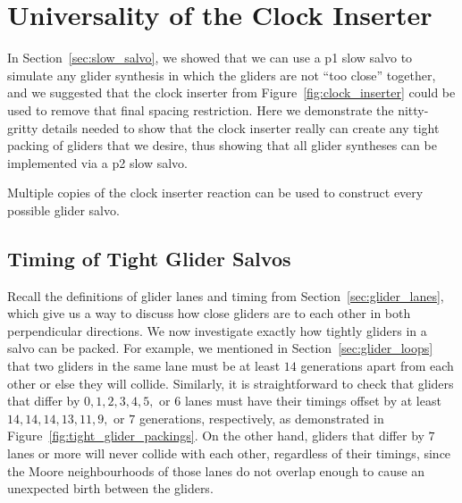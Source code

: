 
\renewcommand{\chapterfolder}{glider_synthesis/}
\chapter{Universality of the Clock Inserter}\label{chp:appendix_salvo}

In Section~\ref{sec:slow_salvo}, we showed that we can use a p1 slow salvo to simulate any glider synthesis in which the gliders are not ``too close'' together, and we suggested that the clock inserter from Figure~\ref{fig:clock_inserter} could be used to remove that final spacing restriction. Here we demonstrate the nitty-gritty details needed to show that the clock inserter really can create any tight packing of gliders that we desire, thus showing that all glider syntheses can be implemented via a p2 slow salvo.
\begin{proposition}\label{prop:clock_inserter}
	Multiple copies of the clock inserter reaction can be used to construct every possible glider salvo.
\end{proposition}


\section{Timing of Tight Glider Salvos}\label{sec:salvo_timing}

Recall the definitions of glider lanes and timing from Section~\ref{sec:glider_lanes}, which give us a way to discuss how close gliders are to each other in both perpendicular directions. We now investigate exactly how tightly gliders in a salvo can be packed. For example, we mentioned in Section~\ref{sec:glider_loops} that two gliders in the same lane must be at least $14$ generations apart from each other or else they will collide. Similarly, it is straightforward to check that gliders that differ by $0, 1, 2, 3, 4, 5,$ or $6$ lanes must have their timings offset by at least $14, 14, 14, 13, 11, 9,$ or $7$ generations, respectively, as demonstrated in Figure~\ref{fig:tight_glider_packings}. On the other hand, gliders that differ by $7$ lanes or more will never collide with each other, regardless of their timings, since the Moore neighbourhoods of those lanes do not overlap enough to cause an unexpected birth between the gliders.

